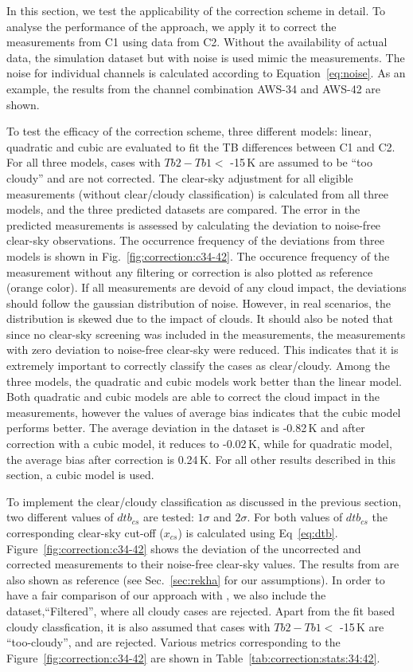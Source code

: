 \documentclass[12pt]{article}
\begin{document}
%
In this section, we test the applicability of the correction scheme in detail. To analyse the performance of the approach, we apply it to correct the measurements from C1 using data from C2. Without the availability of actual data, the simulation dataset but with noise is used mimic the measurements. The noise for individual channels is calculated according to Equation~\ref{eq:noise}. As an example, the results from the channel combination AWS-34 and AWS-42 are shown.

To test the efficacy of the correction scheme, three different models: linear,
quadratic and cubic are evaluated to fit the TB differences between C1 and C2.
For all three models, cases with $Tb2-Tb1 < $ -15\,K are assumed to be ``too
cloudy'' and are not corrected. The clear-sky adjustment for all eligible
measurements (without clear/cloudy classification) is calculated from all three models,
and the three predicted datasets are compared. The error in the predicted
measurements is assessed by calculating the deviation to noise-free clear-sky
observations. The occurrence frequency of the deviations from three models is
shown in Fig.~\ref{fig:correction:c34-42}. The occurence frequency of the
measurement without any filtering or correction is also plotted as reference
(orange color). If all measurements are devoid of any cloud impact, the
deviations should follow the gaussian distribution of noise. However, in real
scenarios, the distribution is skewed due to the impact of clouds. It should
also be noted that since no clear-sky screening was included in the
measurements, the measurements with zero deviation to noise-free clear-sky were
reduced. This indicates that it is extremely important to correctly classify
the cases as clear/cloudy. Among the three models, the quadratic and cubic
models work better than the linear model. Both quadratic and cubic models are
able to correct the cloud impact in the measurements, however the values of
average bias indicates that the cubic model performs better. The average
deviation in the dataset is -0.82\,K and after correction with a cubic model,
it reduces to -0.02\,K, while for quadratic model, the average bias after
correction is 0.24\,K. For all other results described in this section, a cubic
model is used.


To implement the clear/cloudy classification as discussed in the previous section, two
different values of $dtb_{cs}$ are tested: $1\sigma$ and $2\sigma$. For both values of $dtb_{cs}$ the
corresponding clear-sky cut-off ($x_{cs}$) is calculated using
Eq~\ref{eq:dtb}. Figure~\ref{fig:correction:c34-42} shows the deviation of the uncorrected and corrected measurements to their noise-free clear-sky values. The results from
\cite{rekha2012potential} are also shown as reference (see Sec.~\ref{sec:rekha}
for our assumptions). In order to have a fair comparison
of our approach with \cite{rekha2012potential}, we also include the dataset,``Filtered'', where all cloudy cases are rejected.  Apart from the fit based cloudy classfication, it is also assumed that cases with $Tb2-Tb1 < $ -15\,K are ``too-cloudy'', and are rejected.
Various metrics corresponding to the Figure~\ref{fig:correction:c34-42} are shown in
Table~\ref{tab:correction:stats:34:42}. 
\end{document}
